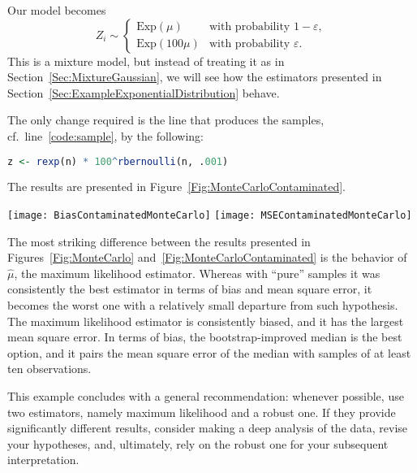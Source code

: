Our model becomes
\begin{equation}
Z_i \sim \left\{
	\begin{array}{cl}
		\text{Exp}(\mu) & \text{with probability } 1-\varepsilon,\\
		\text{Exp}(100\mu) & \text{with probability } \varepsilon.
	\end{array}
\right.
\end{equation}
This is a mixture model, but instead of treating it as in Section~\ref{Sec:MixtureGaussian}, we will see how the estimators presented in Section~\ref{Sec:ExampleExponentialDistribution} behave.

The only change required is the line that produces the samples, cf.~line~\ref{code:sample}, by the following:
\begin{lstlisting}[frame=tb,numbers=none,language=R]
z <- rexp(n) * 100^rbernoulli(n, .001)
\end{lstlisting}

The results are presented in Figure~\ref{Fig:MonteCarloContaminated}.

\begin{figure*}
	\centering
	{\texttt{[image: BiasContaminatedMonteCarlo]}}
	{\texttt{[image: MSEContaminatedMonteCarlo]}}
	\caption{Bias and mean square error of $\widehat{\mu}$ (ML), $\breve{\mu}$ (Med), and $\widetilde{\mu}$ (BootMed) with contaminated data.}\label{Fig:MonteCarloContaminated}
\end{figure*}

The most striking difference between the results presented in Figures~\ref{Fig:MonteCarlo} and~\ref{Fig:MonteCarloContaminated} is the behavior of $\widehat\mu$, the maximum likelihood estimator.
Whereas with ``pure'' samples it was consistently the best estimator in terms of bias and mean square error, it becomes the worst one with a relatively small departure from such hypothesis.
The maximum likelihood estimator is consistently biased, and it has the largest mean square error.
In terms of bias, the bootstrap-improved median is the best option, and it pairs the mean square error of the median with samples of at least ten observations.

This example concludes with a general recommendation:
whenever possible, use two estimators, namely maximum likelihood and a robust one.
If they provide significantly different results, consider making a deep analysis of the data, revise your hypotheses, and, ultimately, rely on the robust one for your subsequent interpretation.

